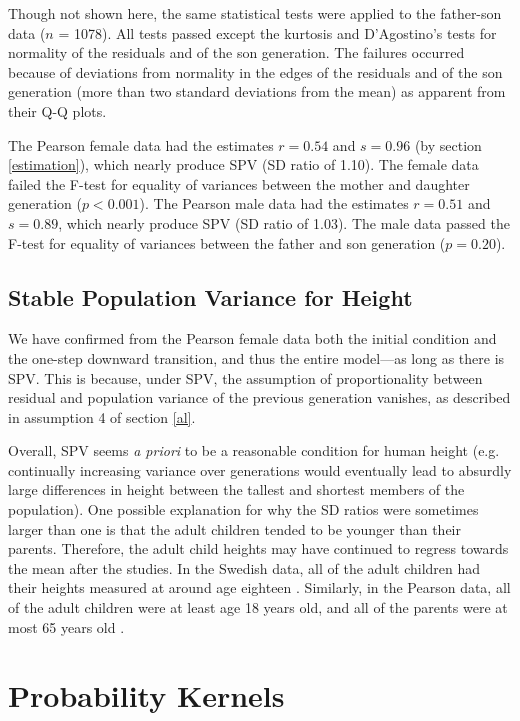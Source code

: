 \documentclass{svproc} %
\begin{document}
Though not shown here, the same statistical tests were applied to the father-son data ($n$ = 1078). All tests passed except the kurtosis and D’Agostino's tests for normality of the residuals and of the son generation. The failures occurred because of deviations from normality in the edges of the residuals and of the son generation (more than two standard deviations from the mean) as apparent from their Q-Q plots.

The Pearson female data had the estimates $r = 0.54$ and $s = 0.96$ (by section \ref{estimation}), which nearly produce SPV (SD ratio of 1.10). The female data failed the F-test for equality of variances between the mother and daughter generation ($p < 0.001$). The Pearson male data had the estimates $r = 0.51$ and $s = 0.89$, which nearly produce SPV (SD ratio of 1.03). The male data passed the F-test for equality of variances between the father and son generation ($p = 0.20$). 

\newpage

\subsection{Stable Population Variance for Height}

We have confirmed from the Pearson female data both the initial condition and the one-step downward transition, and thus the entire model---as long as there is SPV. This is because, under SPV, the assumption of proportionality between residual and population variance of the previous generation vanishes, as described in assumption 4 of section \ref{al}. 

Overall, SPV seems \emph{a priori} to be a reasonable condition for human height (e.g. continually increasing variance over generations would eventually lead to absurdly large differences in height between the tallest and shortest members of the population). One possible explanation for why the SD ratios were sometimes larger than one is that the adult children tended to be younger than their parents. Therefore, the adult child heights may have continued to regress towards the mean after the studies. In the Swedish data, all of the adult children had their heights measured at around age eighteen \cite{karlberg}. Similarly, in the Pearson data, all of the adult children were at least age 18 years old, and all of the parents were at most 65 years old \cite{pearson}. 


\section{Probability Kernels}
\end{document}
